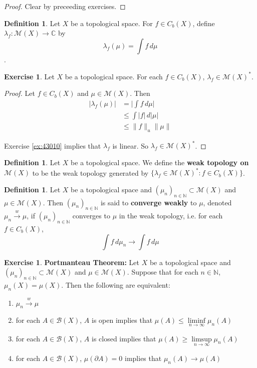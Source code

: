 \documentclass{book}
\theoremstyle{definition}
\newtheorem{defn}[definition]{Definition}
\newtheorem{ex}[definition]{Exercise}
\newcommand{\lam}{\lambda}
\newcommand{\C}{\mathbb{C}}
\newcommand{\N}{\mathbb{N}}
\newcommand{\MB}{\mathcal{B}}
\newcommand{\MM}{\mathcal{M}}
\newcommand{\rex}[1]{Exercise \ref{ex:#1}}
\DeclareMathOperator*{\0}{\mbf{0}}
\DeclareMathOperator*{\1}{\mbf{1}}
\newcommand{\p}{\partial}
\newcommand{\limfn}{\liminf \limits_{n \rightarrow \infty}}
\newcommand{\limpn}{\limsup \limits_{n \rightarrow \infty}}
\newcommand{\conv}[1]{\xrightarrow{#1}}
\newcommand{\dmu}{\, d \mu}
\begin{document}
	\begin{proof}
		Clear by preceeding exercises.
	\end{proof}
	
	
	\begin{defn}
		Let $X$ be a topological space. For $f \in C_b(X)$, define $\lam_f: \MM(X) \rightarrow \C$ by $$\lam_f(\mu) = \int f \dmu$$.
	\end{defn}
	
	\begin{ex}
		Let $X$ be a topological space. For each $f \in C_b(X)$, $\lam_f \in \MM(X)^*$. 
	\end{ex}
	
	\begin{proof}
		Let $f \in C_b(X)$ and $\mu \in \MM(X)$. Then 
		\begin{align*}
			|\lam_f(\mu)| 
			&= \bigg | \int f \dmu \bigg| \\
			&\leq \int |f| \, d |\mu| \\
			& \leq \|f\|_u \|\mu\|
		\end{align*}
		
		\rex{43010} implies that $\lam_f$ is linear. So $\lam_f \in \MM(X)^*$.
	\end{proof}
	
	\begin{defn}
		Let $X$ be a topological space. We define the \textbf{weak topology on $\MM(X)$} to be the weak topology generated by $\{\lam_f \in \MM(X)^*: f \in C_b(X) \}$. 
	\end{defn}
	
	\begin{defn}
		Let $X$ be a topological space and $(\mu_{n})_{n \in \N} \subset \MM(X)$ and $\mu \in \MM(X)$. Then $(\mu_{n})_{n \in \N}$ is said to \textbf{converge  weakly} to $\mu$, denoted $\mu_n \conv{w} \mu$, if $(\mu_{n})_{n \in \N}$ converges to $\mu$ in the weak topology, i.e. for each $f \in C_b(X)$, $$\int f \dmu_n \rightarrow \int f \dmu$$ 
	\end{defn}	
	
	\begin{ex}\textbf{Portmanteau Theorem:}
		Let $X$ be a topological space and $(\mu_{n})_{n \in \N} \subset \MM(X)$ and $\mu \in \MM(X)$. Suppose that for each $n \in \N$, $\mu_n(X) = \mu(X)$. Then the following are equivalent:
		\begin{enumerate}
			\item $\mu_n \conv{w} \mu$
			\item for each $A \in \MB(X)$, $A$ is open implies that $\mu(A) \leq \limfn\limits \mu_n(A) $
			\item for each $A \in \MB(X)$, $A$ is closed implies that $\mu(A) \geq \limpn \limits \mu_n(A) $
			\item for each $A \in \MB(X)$, $\mu( \p A) = 0$ implies that $\mu_n(A) \rightarrow \mu(A) $
		\end{enumerate}
	\end{ex}
	
\end{document}
